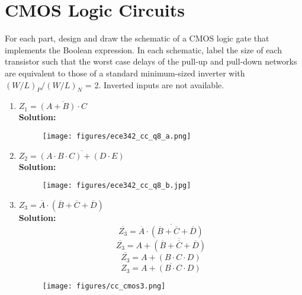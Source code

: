 \documentclass{article}
\begin{document}
\section*{CMOS Logic Circuits}
For each part, design and draw the schematic of a CMOS logic gate that implements the Boolean expression. In each schematic, label the size of each transistor such that the worst case delays of the pull-up and pull-down networks are equivalent to those of a standard minimum-sized inverter with $(W/L)_P/(W/L)_N$ = 2.  Inverted inputs are not available.
\begin{enumerate}[label=(\alph*)]
    \item $Z_1 = \overline{(A+B) \cdot C}$ \\
    
    \textbf{Solution:}
        \begin{figure}[!h]
        \centering
        \texttt{[image: figures/ece342\_cc\_q8\_a.png]}
        \end{figure}
        \newpage
    \item $Z_2 = \overline{(A \cdot B \cdot C) + (D \cdot E)}$ \\
    
    \textbf{Solution:}
        \begin{figure}[!h]
        \centering
        \texttt{[image: figures/ece342\_cc\_q8\_b.jpg]}
        \end{figure}
\newpage
    \item $Z_3 = \overline{A} \cdot (\overline{B} + \overline{C} + \overline{D})$ \\
    
    \textbf{Solution:}
    $$\overline{Z_3} = \overline{\overline{A} \cdot (\overline{B} + \overline{C} + \overline{D})}$$
    $$\overline{Z_3} = A + \overline{(\overline{B} + \overline{C} + \overline{D})}$$
    $$\overline{Z_3} = A + (B \cdot C \cdot D)$$
    $$Z_3 = \overline{A + (B \cdot C \cdot D)}$$
    \begin{figure}[!h]
        \centering
        \texttt{[image: figures/cc\_cmos3.png]}
        \end{figure}
\end{enumerate}
\end{document}
